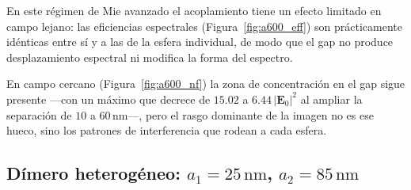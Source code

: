 En este régimen de Mie avanzado el acoplamiento tiene un efecto limitado en
campo lejano: las eficiencias espectrales (Figura~\ref{fig:a600_eff}) son
prácticamente idénticas entre sí y a las de la esfera individual, de modo que
el gap no produce desplazamiento espectral ni modifica la forma del espectro.

En campo cercano (Figura~\ref{fig:a600_nf}) la zona de concentración en el gap
sigue presente —con un máximo que decrece de $15.02$ a $6.44\,|\mathbf{E}_0|^2$
al ampliar la separación de $10$ a $60\,\text{nm}$—, pero el rasgo dominante de
la imagen no es ese hueco, sino los patrones de interferencia que rodean a cada
esfera.

\subsection{Dímero heterogéneo: $a_1 = 25\,\text{nm}$, $a_2 = 85\,\text{nm}$}
\label{subsec:dimero_hetero}



